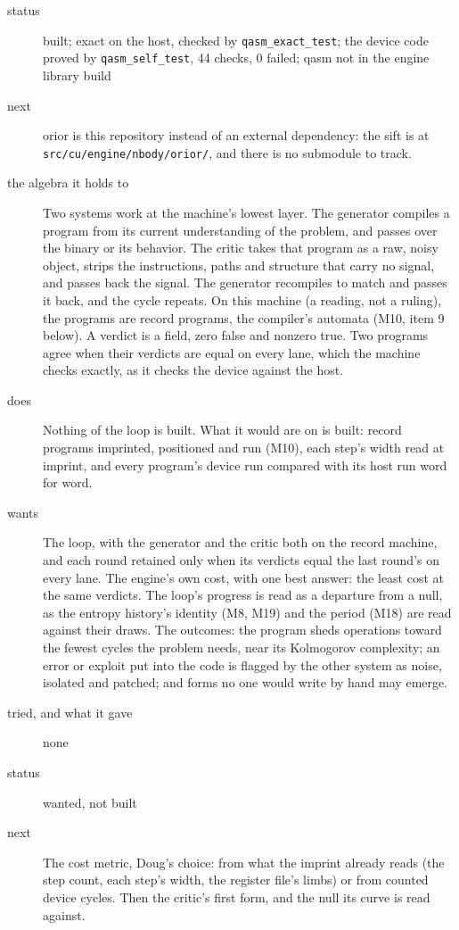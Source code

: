 \begin{description}
\item[{status}] built; exact on the host, checked by \texttt{qasm\_\allowbreak{}exact\_\allowbreak{}test}; the device code proved by \texttt{qasm\_\allowbreak{}self\_\allowbreak{}test}, 44 checks, 0 failed; qasm not in the engine library build
\item[{next}] orior is this repository instead of an external dependency: the sift is at \texttt{src/\allowbreak{}cu/\allowbreak{}engine/\allowbreak{}nbody/\allowbreak{}orior/\allowbreak{}}, and there is no submodule to track.
\end{description}

\begin{description}
\item[{the algebra it holds to}] Two systems work at the machine's lowest layer. The generator compiles a program from its current understanding of the problem, and passes over the binary or its behavior. The critic takes that program as a raw, noisy object, strips the instructions, paths and structure that carry no signal, and passes back the signal. The generator recompiles to match and passes it back, and the cycle repeats. On this machine (a reading, not a ruling), the programs are record programs, the compiler's automata (M10, item 9 below). A verdict is a field, zero false and nonzero true. Two programs agree when their verdicts are equal on every lane, which the machine checks exactly, as it checks the device against the host.
\item[{does}] Nothing of the loop is built. What it would are on is built: record programs imprinted, positioned and run (M10), each step's width read at imprint, and every program's device run compared with its host run word for word.
\item[{wants}] The loop, with the generator and the critic both on the record machine, and each round retained only when its verdicts equal the last round's on every lane. The engine's own cost, with one best answer: the least cost at the same verdicts. The loop's progress is read as a departure from a null, as the entropy history's identity (M8, M19) and the period (M18) are read against their draws. The outcomes: the program sheds operations toward the fewest cycles the problem needs, near its Kolmogorov complexity; an error or exploit put into the code is flagged by the other system as noise, isolated and patched; and forms no one would write by hand may emerge.
\item[{tried, and what it gave}] none
\item[{status}] wanted, not built
\item[{next}] The cost metric, Doug's choice: from what the imprint already reads (the step count, each step's width, the register file's limbs) or from counted device cycles. Then the critic's first form, and the null its curve is read against.
\end{description}

